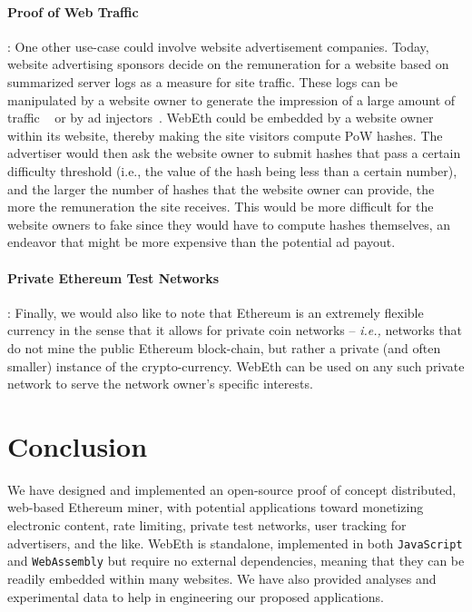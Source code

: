 \documentclass[runningheads]{llncs}
\newcommand{\trishita}[1]{}%
\begin{document}
\paragraph{\textbf{Proof of Web Traffic}}:
One other use-case could involve website advertisement companies. Today, website advertising sponsors decide on the remuneration for a website based on summarized server logs as a measure for site traffic. \trishita{CITE!!} These logs can be manipulated by a website owner to generate the impression of a large amount of traffic ~\cite{webLogsManipulation} or by ad injectors~\cite{adinjection}. WebEth could be embedded by a website owner within its website, thereby making the site visitors compute PoW hashes. The advertiser would then ask the website owner to submit hashes that pass a certain difficulty threshold (i.e., the value of the hash being less than a certain number), and the larger the number of hashes that the website owner can provide, the more the remuneration the site receives. This would be more difficult for the website owners to fake since they would have to compute hashes themselves, an endeavor that might be more expensive than the potential ad payout.

\paragraph{\textbf{Private Ethereum Test Networks}}:
Finally, we would also like to note that Ethereum is an extremely flexible currency in the sense that it allows for private coin networks -- \emph{i.e.,} networks that do not mine the public Ethereum block-chain, but rather a private (and often smaller) instance of the crypto-currency. WebEth can be used on any such private network to serve the network owner's specific interests.

\section{Conclusion}
\label{sec:conclusion}
We have designed and implemented an open-source proof of concept distributed, web-based Ethereum miner, with potential applications toward monetizing electronic content, rate limiting, private test networks, user tracking for advertisers, and the like. WebEth is standalone, implemented in both \verb|JavaScript| and \verb|WebAssembly| but require no external dependencies, meaning that they can be readily embedded within many websites.  We have also provided analyses and experimental data to help in engineering our proposed applications.
\end{document}

